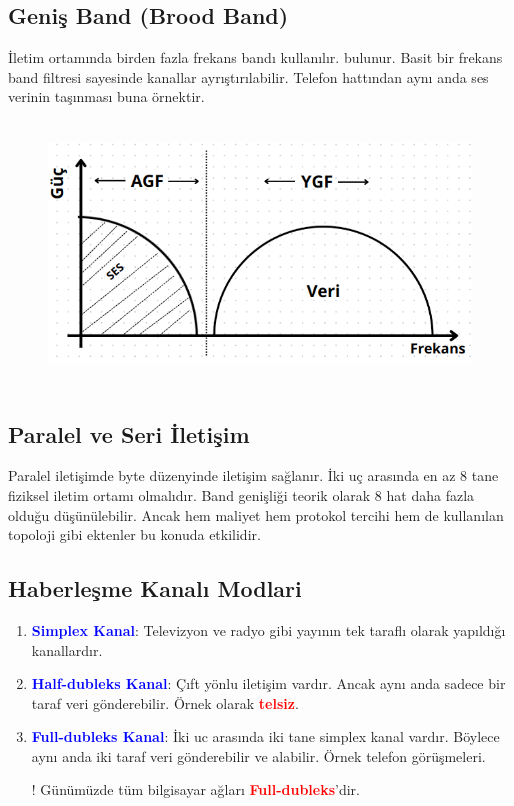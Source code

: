 \subsection{Geniş Band (Brood Band)}
\tab İletim ortamında birden fazla frekans bandı kullanılır.
bulunur. Basit bir frekans band filtresi sayesinde kanallar ayrıştırılabilir.
Telefon hattından aynı anda ses verinin taşınması buna örnektir.
\begin{figure}[ht]
    \centering
    \includegraphics[width=17cm,height=7cm]{images/brood_band}
\end{figure}

\subsection{Paralel ve Seri İletişim}
\tab Paralel iletişimde byte düzenyinde iletişim sağlanır.
İki uç arasında en az 8 tane fiziksel iletim ortamı olmalıdır.
Band genişliği teorik olarak 8 hat daha fazla olduğu düşünülebilir.
Ancak hem maliyet hem protokol tercihi hem de kullanılan topoloji gibi ektenler bu konuda etkilidir.

\subsection{Haberleşme Kanalı Modlari}
\begin{enumerate}[label=\alph*)]
    \item \textbf{\textcolor{blue}{ Simplex Kanal}}: Televizyon ve radyo gibi yayının tek taraflı olarak yapıldığı kanallardır.
    \item  \textbf{\textcolor{blue}{ Half-dubleks Kanal}}: Çıft yönlu iletişim vardır.
    Ancak aynı anda sadece bir taraf veri gönderebilir. Örnek olarak \textbf{\textcolor{red}{telsiz}}.
    \item \textbf{\textcolor{blue}{ Full-dubleks Kanal}}: İki uc arasında iki tane simplex kanal vardır.
    Böylece aynı anda iki taraf veri gönderebilir ve alabilir.
    Örnek telefon görüşmeleri.
    \item [!] Günümüzde tüm bilgisayar ağları \textbf{\textcolor{red}{Full-dubleks}}'dir.
\end{enumerate}


